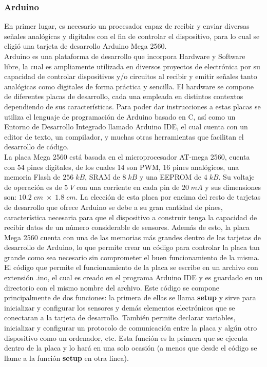 \documentclass[12pt]{article}
\begin{document}
\subsubsection{Arduino}

En primer lugar, es necesario un procesador capaz de recibir y enviar diversas señales analógicas y digitales con el fin de controlar el dispositivo, para lo cual se eligió una tarjeta de desarrollo Arduino Mega 2560. \\

Arduino es una plataforma de desarrollo que incorpora Hardware y Software libre, la cual es ampliamente utilizada en diversos proyectos de electrónica por su capacidad de controlar dispositivos y/o circuitos al recibir y emitir señales tanto analógicas como digitales de forma práctica y sencilla. El hardware se compone de diferentes placas de desarrollo, cada una empleada en distintos contextos dependiendo de sus características. Para poder dar instrucciones a estas placas se utiliza el lenguaje de programación de Arduino basado en C, así como un Entorno de Desarrollo Integrado llamado Arduino IDE, el cual cuenta con un editor de texto, un compilador, y muchas otras herramientas que facilitan el desarrollo de código. \\

La placa Mega 2560 está basada en el microprocesador AT-mega 2560, cuenta con 54 pines digitales, de los cuales 14 son PWM, 16 pines analógicos, una memoria Flash de $256 \; kB$, SRAM de $8 \; kB$ y una EEPROM de $4 \; kB$. Su voltaje de operación es de $5 \; V$ con una corriente en cada pin de $20 \; mA$ y sus dimensiones son: $10.2 \; cm \; \times \; 1.8 \; cm$. La elección de esta placa por encima del resto de tarjetas de desarrollo que ofrece Arduino se debe a su gran cantidad de pines, característica necesaria para que el dispositivo a construir tenga la capacidad de recibir datos de un número considerable de sensores. Además de esto, la placa Mega 2560 cuenta con una de las memorias más grandes dentro de las tarjetas de desarrollo de Arduino, lo que permite crear un código para controlar la placa tan grande como sea necesario sin comprometer el buen funcionamiento de la misma. \\

El código que permite el funcionamiento de la placa se escribe en un archivo con extensión .ino, el cual es creado en el programa Arduino IDE y es guardado en un directorio con el mismo nombre del archivo. Este código se compone principalmente de dos funciones: la primera de ellas se llama \textbf{setup} y sirve para inicializar y configurar los sensores y demás elementos electrónicos que se conectaran a la tarjeta de desarrollo. También permite declarar variables, inicializar y configurar un protocolo de comunicación entre la placa y algún otro dispositivo como un ordenador, etc. Esta función es la primera que se ejecuta dentro de la placa y lo hará en una solo ocasión (a menos que desde el código se llame a la función \textbf{setup} en otra linea). \\
\end{document}
